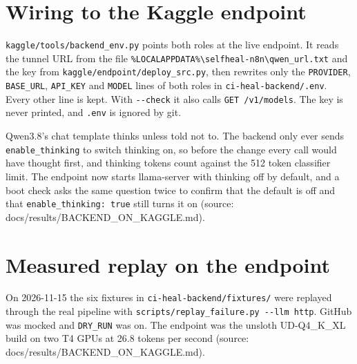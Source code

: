 \documentclass[11pt,a4paper]{report}
\begin{document}
\section{Wiring to the Kaggle endpoint}

\texttt{kaggle/\allowbreak{}tools/\allowbreak{}backend\_\allowbreak{}env.\allowbreak{}py} points both roles at the live endpoint. It reads the tunnel URL from the file \texttt{\%LOCALAPPDATA\%\textbackslash{}selfheal-\allowbreak{}n8n\textbackslash{}qwen\_\allowbreak{}url.\allowbreak{}txt} and the key from \texttt{kaggle/\allowbreak{}endpoint/\allowbreak{}deploy\_\allowbreak{}src.\allowbreak{}py}, then rewrites only the \texttt{PROVIDER}, \texttt{BASE\_\allowbreak{}URL}, \texttt{API\_\allowbreak{}KEY} and \texttt{MODEL} lines of both roles in \texttt{ci-\allowbreak{}heal-\allowbreak{}backend/\allowbreak{}.\allowbreak{}env}. Every other line is kept. With \texttt{-\allowbreak{}-\allowbreak{}check} it also calls \texttt{GET /\allowbreak{}v1/\allowbreak{}models}. The key is never printed, and \texttt{.\allowbreak{}env} is ignored by git.

Qwen3.8's chat template thinks unless told not to. The backend only ever sends \texttt{enable\_\allowbreak{}thinking} to switch thinking on, so before the change every call would have thought first, and thinking tokens count against the 512 token classifier limit. The endpoint now starts llama-server with thinking off by default, and a boot check asks the same question twice to confirm that the default is off and that \texttt{enable\_\allowbreak{}thinking: true} still turns it on (source: docs/results/BACKEND\_ON\_KAGGLE.md).

\section{Measured replay on the endpoint}

On 2026-11-15 the six fixtures in \texttt{ci-\allowbreak{}heal-\allowbreak{}backend/\allowbreak{}fixtures/\allowbreak{}} were replayed through the real pipeline with \texttt{scripts/\allowbreak{}replay\_\allowbreak{}failure.\allowbreak{}py -\allowbreak{}-\allowbreak{}llm http}. GitHub was mocked and \texttt{DRY\_\allowbreak{}RUN} was on. The endpoint was the unsloth UD-Q4\_K\_XL build on two T4 GPUs at 26.8 tokens per second (source: docs/results/BACKEND\_ON\_KAGGLE.md).
\end{document}

